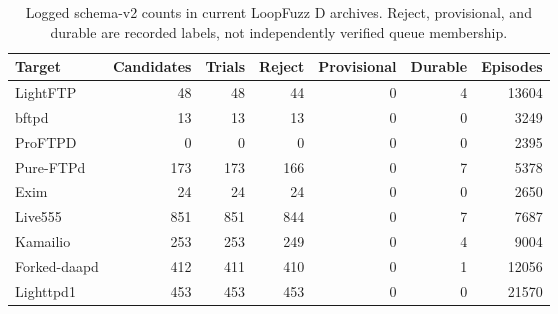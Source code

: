 \begin{table}[!tbp]
\centering\small
\caption{Logged schema-v2 counts in current LoopFuzz D archives. Reject, provisional, and durable are recorded labels, not independently verified queue membership.}
\label{tab:observed_log_counts}
\begin{tabular}{lrrrrrr}
\toprule
Target & Candidates & Trials & Reject & Provisional & Durable & Episodes \\
\midrule
LightFTP & 48 & 48 & 44 & 0 & 4 & 13604 \\
bftpd & 13 & 13 & 13 & 0 & 0 & 3249 \\
ProFTPD & 0 & 0 & 0 & 0 & 0 & 2395 \\
Pure-FTPd & 173 & 173 & 166 & 0 & 7 & 5378 \\
Exim & 24 & 24 & 24 & 0 & 0 & 2650 \\
Live555 & 851 & 851 & 844 & 0 & 7 & 7687 \\
Kamailio & 253 & 253 & 249 & 0 & 4 & 9004 \\
Forked-daapd & 412 & 411 & 410 & 0 & 1 & 12056 \\
Lighttpd1 & 453 & 453 & 453 & 0 & 0 & 21570 \\
\bottomrule
\end{tabular}
\end{table}
